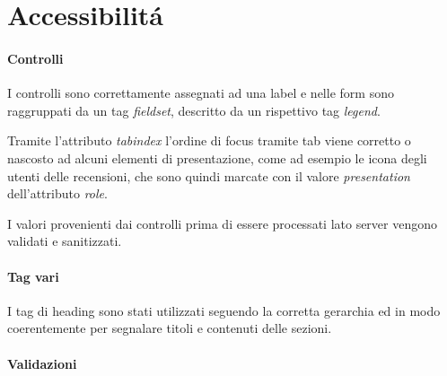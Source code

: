 \section{Accessibilitá}

\paragraph{Controlli}
I controlli sono correttamente assegnati ad una label e nelle form sono raggruppati da un tag \textit{fieldset}, descritto da un rispettivo tag \textit{legend}.


Tramite l'attributo \textit{tabindex} l'ordine di focus tramite tab viene corretto o nascosto ad alcuni elementi di presentazione, come ad esempio le icona degli utenti delle recensioni, che sono quindi marcate con il valore \textit{presentation} dell'attributo \textit{role}.


I valori provenienti dai controlli prima di essere processati lato server vengono validati e sanitizzati.

\paragraph{Tag vari}
I tag di heading sono stati utilizzati seguendo la corretta gerarchia ed in modo coerentemente per segnalare titoli e contenuti delle sezioni.

\paragraph{Validazioni}

